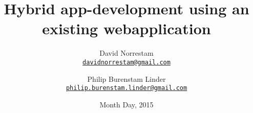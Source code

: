 \documentclass{./tex/cslthse-msc}
\author{
	David Norrestam \\
	{\normalsize \href{mailto:davidnorrestam@gmail.com}{\texttt{davidnorrestam@gmail.com}}}
	\and
	Philip Burenstam Linder \\
    {\normalsize \href{mailto:philip.burenstam.linder@gmail.com}{\texttt{philip.burenstam.linder@gmail.com}}}
}
\title{Hybrid app-development using an existing webapplication}
\date{Month Day, 2015}
\begin{document}
\makefrontmatter





\end{document}
